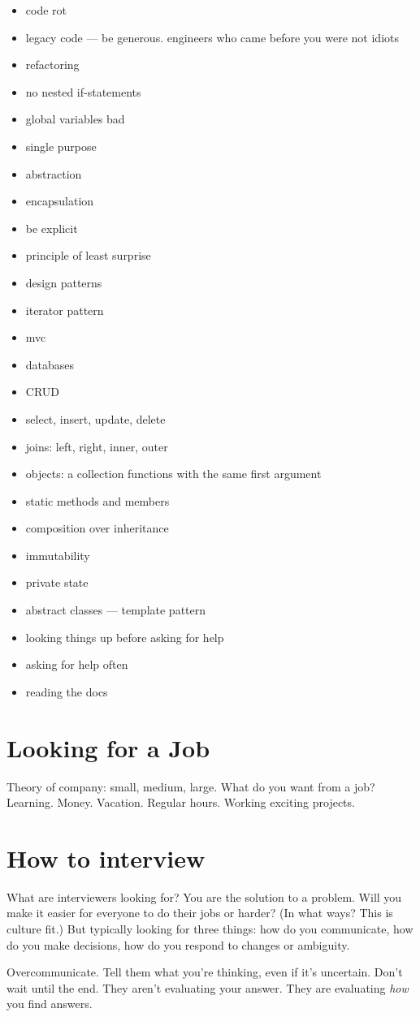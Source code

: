 \begin{itemize}
  \item code rot
  \item legacy code --- be generous. engineers who came before you were not idiots
  \item refactoring
  \item no nested if-statements
  \item global variables bad
  \item single purpose
  \item abstraction
  \item encapsulation
  \item be explicit
  \item principle of least surprise

  \item design patterns
  \item iterator pattern
  \item mvc
  \item databases
  \item CRUD
  \item select, insert, update, delete
  \item joins: left, right, inner, outer

  \item objects: a collection functions with the same first argument
  \item static methods and members
  \item composition over inheritance
  \item immutability
  \item private state
  \item abstract classes --- template pattern
  \item looking things up before asking for help
  \item asking for help often
  \item reading the docs
\end{itemize}

\section{Looking for a Job}
Theory of company: small, medium, large. What do you want from a job? Learning. Money. Vacation. Regular hours. Working exciting projects.

\section{How to interview} What are interviewers looking for? You are the solution to a problem. Will you make it easier for everyone to do their jobs or harder? (In what ways? This is culture fit.) But typically looking for three things: how do you communicate, how do you make decisions, how do you respond to changes or ambiguity.

Overcommunicate. Tell them what you're thinking, even if it's uncertain. Don't wait until the end. They aren't evaluating your answer. They are evaluating \emph{how} you find answers.
